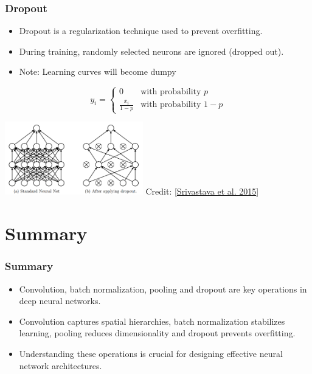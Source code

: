 \documentclass[aspectratio=169]{../latex_main/tntbeamer}  %
\begin{document}
    \begin{frame}
    \frametitle{Dropout}
    \begin{itemize}
        \item Dropout is a regularization technique used to prevent overfitting.
        \item During training, randomly selected neurons are ignored (dropped out).
        \item Note: Learning curves will become dumpy
    \end{itemize}
    \begin{equation}
        y_i = 
        \begin{cases} 
        0 & \text{with probability } p \\
        \frac{x_i}{1-p} & \text{with probability } 1-p 
        \end{cases}
    \end{equation}

    \centering
    \includegraphics[width=0.45\textwidth]{figures/dropout.png} Credit: [\href{https://jmlr.org/papers/volume15/srivastava14a/srivastava14a.pdf}{Srivastava et al. 2015}]

    \end{frame}
    
    \section{Summary}
    \begin{frame}
    \frametitle{Summary}
    \begin{itemize}
        \item Convolution, batch normalization, pooling and dropout are key operations in deep neural networks.
        \item Convolution captures spatial hierarchies, batch normalization stabilizes learning, pooling reduces dimensionality and dropout prevents overfitting.
        \item Understanding these operations is crucial for designing effective neural network architectures.
    \end{itemize}
    \end{frame}

    


 	
\end{document}
